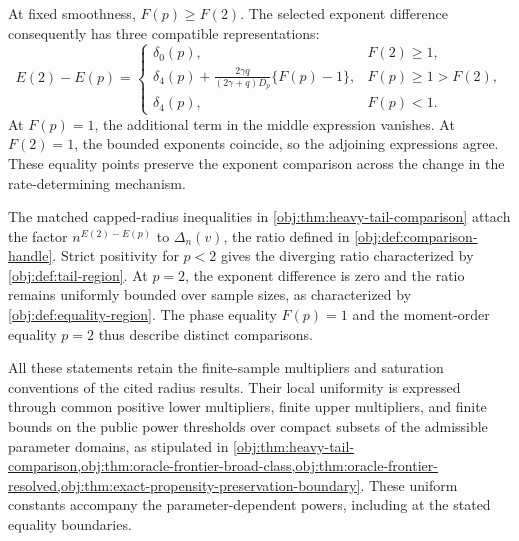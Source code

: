 \documentclass[11pt]{article}
\begin{document}
At fixed smoothness, \(F(p)\ge F(2)\). The selected exponent difference consequently has three compatible representations:
\[
E(2)-E(p)=
\begin{cases}
\delta_0(p), & F(2)\ge1,\\[3pt]
\displaystyle
\delta_4(p)+
\frac{2\gamma q}{(2\gamma+q)D_p}\{F(p)-1\},
& F(p)\ge1>F(2),\\[8pt]
\delta_4(p), & F(p)<1.
\end{cases}
\]
At \(F(p)=1\), the additional term in the middle expression vanishes. At \(F(2)=1\), the bounded exponents coincide, so the adjoining expressions agree. These equality points preserve the exponent comparison across the change in the rate-determining mechanism.

The matched capped-radius inequalities in \cref{obj:thm:heavy-tail-comparison} attach the factor \(n^{E(2)-E(p)}\) to \(\Delta_n(v)\), the ratio defined in \cref{obj:def:comparison-handle}. Strict positivity for \(p<2\) gives the diverging ratio characterized by \cref{obj:def:tail-region}. At \(p=2\), the exponent difference is zero and the ratio remains uniformly bounded over sample sizes, as characterized by \cref{obj:def:equality-region}. The phase equality \(F(p)=1\) and the moment-order equality \(p=2\) thus describe distinct comparisons.

All these statements retain the finite-sample multipliers and saturation conventions of the cited radius results. Their local uniformity is expressed through common positive lower multipliers, finite upper multipliers, and finite bounds on the public power thresholds over compact subsets of the admissible parameter domains, as stipulated in \cref{obj:thm:heavy-tail-comparison,obj:thm:oracle-frontier-broad-class,obj:thm:oracle-frontier-resolved,obj:thm:exact-propensity-preservation-boundary}. These uniform constants accompany the parameter-dependent powers, including at the stated equality boundaries.
\end{document}

